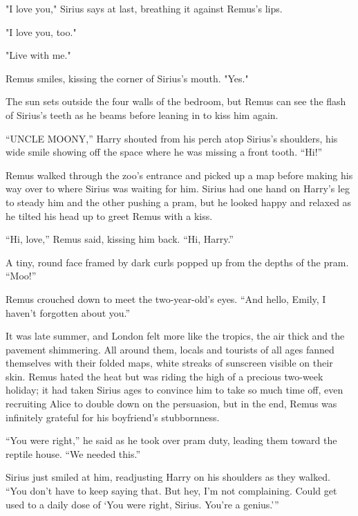 "I love you," Sirius says at last, breathing it against Remus's lips.

"I love you, too."

"Live with me."

Remus smiles, kissing the corner of Sirius's mouth. "Yes."

The sun sets outside the four walls of the bedroom, but Remus can see the flash of Sirius's teeth as he beams before leaning in to kiss him again.

\newpage



“UNCLE MOONY,” Harry shouted from his perch atop Sirius’s shoulders, his wide smile showing off the space where he was missing a front tooth. “Hi!”

Remus walked through the zoo’s entrance and picked up a map before making his way over to where Sirius was waiting for him. Sirius had one hand on Harry’s leg to steady him and the other pushing a pram, but he looked happy and relaxed as he tilted his head up to greet Remus with a kiss.

“Hi, love,” Remus said, kissing him back. “Hi, Harry.”

A tiny, round face framed by dark curls popped up from the depths of the pram. “Moo!”

Remus crouched down to meet the two-year-old’s eyes. “And hello, Emily, I haven’t forgotten about you.”

It was late summer, and London felt more like the tropics, the air thick and the pavement shimmering. All around them, locals and tourists of all ages fanned themselves with their folded maps, white streaks of sunscreen visible on their skin. Remus hated the heat but was riding the high of a precious two-week holiday; it had taken Sirius ages to convince him to take so much time off, even recruiting Alice to double down on the persuasion, but in the end, Remus was infinitely grateful for his boyfriend’s stubbornness.

“You were right,” he said as he took over pram duty, leading them toward the reptile house. “We needed this.”

Sirius just smiled at him, readjusting Harry on his shoulders as they walked. “You don’t have to keep saying that. But hey, I’m not complaining. Could get used to a daily dose of ‘You were right, Sirius. You’re a genius.’”

